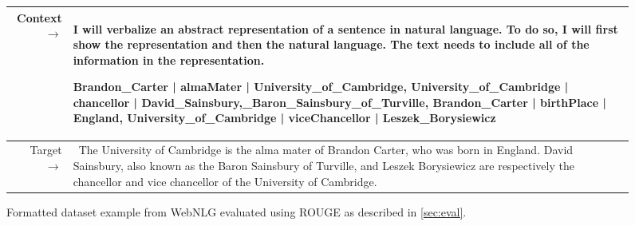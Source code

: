 \documentclass{article}
\begin{document}
\begin{figure}[!h] { \tt \footnotesize \begin{tabularx}{\linewidth}{r X} \toprule Context $\to$ & I will verbalize an abstract representation of a sentence in natural language. To do so, I will first show the representation and then the natural language. The text needs to include all of the information in the representation.

Brandon\_Carter | almaMater | University\_of\_Cambridge, University\_of\_Cambridge | chancellor | David\_Sainsbury,\_Baron\_Sainsbury\_of\_Turville, Brandon\_Carter | birthPlace | England, University\_of\_Cambridge | viceChancellor | Leszek\_Borysiewicz\\
\midrule 
Target $\to$ & ~The University of Cambridge is the alma mater of Brandon Carter, who was born in England. David Sainsbury, also known as the Baron Sainsbury of Turville, and Leszek Borysiewicz are respectively the chancellor and vice chancellor of the University of Cambridge.\\
\bottomrule \end{tabularx} }
\caption{Formatted dataset example from WebNLG evaluated using ROUGE as described in \autoref{sec:eval}.}  
\label{eval:webnlg}  
\end{figure}
\end{document}
